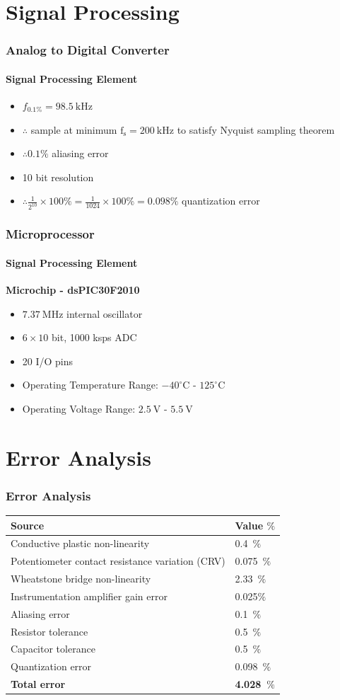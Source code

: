 \documentclass{beamer}
\begin{document}
\section{Signal Processing}
\begin{frame}
\frametitle{Analog to Digital Converter}
\framesubtitle{Signal Processing Element}

\begin{itemize}
	\item $f_{0.1\%} = 98.5~\mathrm{kHz}$
	\item $ \therefore $ sample at minimum $ \mathrm{f_s} = 200~\mathrm{kHz} $ to satisfy Nyquist sampling theorem
	\item $ \therefore 0.1 \% $ aliasing error
	\item 10 bit resolution
	\item $ \therefore \frac{1}{2^{10}}\times 100\% = \frac{1}{1024} \times 100 \% = 0.098 \% $ quantization error
\end{itemize}
\end{frame}
\begin{frame}
\frametitle{Microprocessor}
\framesubtitle{Signal Processing Element}

\textbf{Microchip - dsPIC30F2010}
\begin{itemize}
\item $7.37~\mathrm{MHz}$ internal oscillator
\item $6 \times 10$ bit, 1000 ksps ADC
\item 20 I/O pins
\item Operating Temperature Range: $-40^\circ \mathrm{C}$ - $125^\circ \mathrm{C}$
\item Operating Voltage Range: $2.5~\mathrm{V}$ - $5.5~\mathrm{V}$
\end{itemize}
\end{frame}

\section{Error Analysis}
\begin{frame}
\frametitle{Error Analysis}
\begin{tabular}{|l|l|}
	\hline
	\textbf{Source} & \textbf{Value $\%$} \\ \hline
	Conductive plastic non-linearity & 0.4~$\%$ \\
	Potentiometer contact resistance variation (CRV) & 0.075~$\%$ \\
	Wheatstone bridge non-linearity & 2.33~$\%$\\
	Instrumentation amplifier gain error & 0.025$\%$ \\
	Aliasing error & 0.1~$\%$ \\
	Resistor tolerance & 0.5~$\%$ \\
	Capacitor tolerance & 0.5~$\%$ \\
	Quantization error & 0.098~$\%$ \\ \hline
	\textbf{Total error} &  \textbf{4.028~$\%$} \\ \hline
\end{tabular}

\end{frame}
\end{document}
